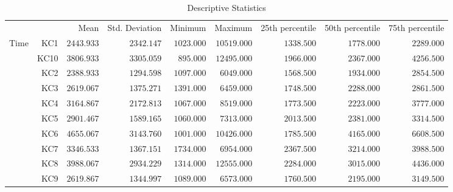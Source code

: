 \documentclass[]{article}
\begin{document}
\begin{table}[h]
	\centering
	\caption{Descriptive Statistics}
	\label{tab:descriptiveStatistics}
	{
		\begin{tabular}{lrrrrrrrr}
			\toprule
			 &  & Mean & Std. Deviation & Minimum & Maximum & 25th percentile & 50th percentile & 75th percentile  \\
			\cmidrule[0.4pt]{1-9}
			Time & KC1 & $2443.933$ & $2342.147$ & $1023.000$ & $10519.000$ & $1338.500$ & $1778.000$ & $2289.000$  \\
			 & KC10 & $3806.933$ & $3305.059$ & $895.000$ & $12495.000$ & $1966.000$ & $2367.000$ & $4256.500$  \\
			 & KC2 & $2388.933$ & $1294.598$ & $1097.000$ & $6049.000$ & $1568.500$ & $1934.000$ & $2854.500$  \\
			 & KC3 & $2619.067$ & $1375.271$ & $1391.000$ & $6459.000$ & $1748.500$ & $2288.000$ & $2861.500$  \\
			 & KC4 & $3164.867$ & $2172.813$ & $1067.000$ & $8519.000$ & $1773.500$ & $2223.000$ & $3777.000$  \\
			 & KC5 & $2901.467$ & $1589.165$ & $1060.000$ & $7313.000$ & $2013.500$ & $2381.000$ & $3314.500$  \\
			 & KC6 & $4655.067$ & $3143.760$ & $1001.000$ & $10426.000$ & $1785.500$ & $4165.000$ & $6608.500$  \\
			 & KC7 & $3346.533$ & $1367.151$ & $1734.000$ & $6954.000$ & $2367.500$ & $3214.000$ & $3988.500$  \\
			 & KC8 & $3988.067$ & $2934.229$ & $1314.000$ & $12555.000$ & $2284.000$ & $3015.000$ & $4436.000$  \\
			 & KC9 & $2619.867$ & $1344.997$ & $1089.000$ & $6573.000$ & $1760.500$ & $2195.000$ & $3149.500$  \\
			\bottomrule
		\end{tabular}
	}
\end{table}
\end{document}
